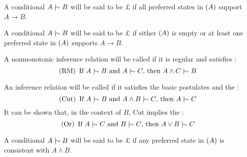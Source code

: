 \begin{defi}
A conditional $A\dashsim B$ will be said to be  $\pounds$ if all preferred states in $\left( A\right)$ support $A\rightarrow B$.
\cite{conf/ijcai/Bochman99}
\end{defi}

\begin{defi}
A conditional $A\dashsim B$ will be said to be  $\pounds$ if either $\left( A\right)$ is empty or at least one preferred state in $\left( A\right)$ supports $A\rightarrow B$.
\cite{conf/ijcai/Bochman99}
\end{defi}

\begin{defi}
A nonmonotonic inference relation will be called  if it is regular and satisfies :
\begin{equation}
\brak{\mbox{RM}}\mbox{ If }A\dashsim B\mbox{ and } A\negdashsim C\mbox{, then } A\wedge C\dashsim B
\end{equation}
\cite{conf/ijcai/Bochman99}
\end{defi}

\begin{defi}
An inference relation will be called  if it satisfies the basic postulates and the :
\begin{equation}
\brak{\mbox{Cut}}\mbox{ If }A\dashsim B\mbox{ and } A\wedge B\dashsim C\mbox{, then } A\dashsim C
\end{equation}
It can be shown that, in the context of $B$, Cut implies the :
\begin{equation}
\brak{\mbox{Or}}\mbox{ If }A\dashsim C\mbox{ and } B\dashsim C\mbox{, then } A\vee B\dashsim C
\end{equation}
\cite{conf/ijcai/Bochman99}
\end{defi}

\begin{defi}
A conditional $A\dashsim B$ will be said to be  $\pounds$ if any preferred state in $\left( A\right)$ is consistent with $A\wedge B$.
\cite{conf/ijcai/Bochman99}
\end{defi}

